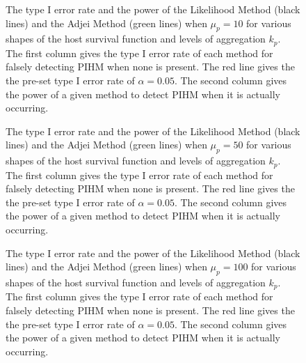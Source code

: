\documentclass[12pt, a4paper]{article}
\begin{document}
\begin{figure}


    \captionsetup{justification=raggedright, singlelinecheck=false}

    \caption{\doublespacing The type I error rate and the power of the Likelihood Method (black lines) and the Adjei Method (green lines) when $\mu_p = 10$ for various shapes of the host survival function and levels of aggregation $k_p$.  The first column gives the type I error rate of each method for falsely detecting PIHM when none is present.  The red line gives the the pre-set type I error rate of $\alpha = 0.05$.  The second column gives the power of a given method to detect PIHM when it is actually occurring. }
    \label{fig:typeI10}

\end{figure}

\begin{figure}


    \captionsetup{justification=raggedright, singlelinecheck=false}

    \caption{\doublespacing The type I error rate and the power of the Likelihood Method (black lines) and the Adjei Method (green lines) when $\mu_p = 50$ for various shapes of the host survival function and levels of aggregation $k_p$.  The first column gives the type I error rate of each method for falsely detecting PIHM when none is present.  The red line gives the the pre-set type I error rate of $\alpha = 0.05$.  The second column gives the power of a given method to detect PIHM when it is actually occurring. }
    \label{fig:typeI50}

\end{figure}

\begin{figure}


    \captionsetup{justification=raggedright, singlelinecheck=false}

    \caption{\doublespacing The type I error rate and the power of the Likelihood Method (black lines) and the Adjei Method (green lines) when $\mu_p = 100$ for various shapes of the host survival function and levels of aggregation $k_p$.  The first column gives the type I error rate of each method for falsely detecting PIHM when none is present.  The red line gives the the pre-set type I error rate of $\alpha = 0.05$.  The second column gives the power of a given method to detect PIHM when it is actually occurring. }
    \label{fig:typeI100}

\end{figure}
\end{document}
